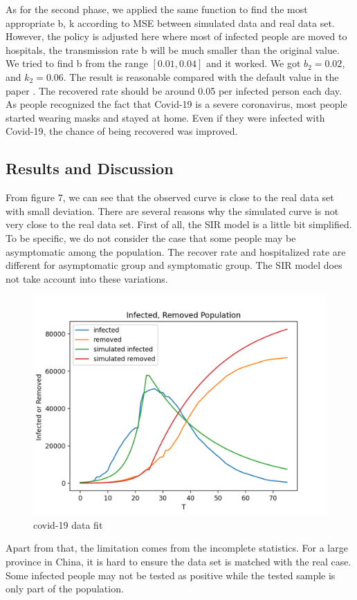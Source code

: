 \documentclass{article}
\begin{document}
As for the second phase, we applied the same function to find the most appropriate b, k according to MSE between simulated data and real data set. However, the policy is adjusted here where most of infected people are moved to hospitals, the transmission rate b will be much smaller than the original value. We tried to find b from the range $[0.01, 0.04]$ and it worked. We got $b_{2}= 0.02$, and $k_{2} = 0.06$. The result is reasonable compared with the default value in the paper \cite{Cooper2020SIR}. The recovered rate should be around 0.05 per infected person each day. As people recognized the fact that Covid-19 is a severe coronavirus, most people started wearing masks and stayed at home. Even if they were infected with Covid-19, the chance of being recovered was improved. 





\subsection{Results and Discussion}

From figure 7, we can see that the observed curve is close to the real data set with small deviation. There are several reasons why the simulated curve is not very close to the real data set. First of all, the SIR model is a little bit simplified. To be specific, we do not consider the case that some people may be asymptomatic among the population. The recover rate and hospitalized rate are different for asymptomatic group and symptomatic group. The SIR model does not take account into these variations. 


\begin{figure}[htp]
\centering
\includegraphics[width=.4\textwidth]{covidsir4.png}
\caption{covid-19 data fit}
\label{fig:figure6}
\end{figure}



Apart from that, the limitation comes from the incomplete statistics. For a large province in China, it is hard to ensure the data set is matched with the real case. Some infected people may not be tested as positive while the tested sample is only part of the population.
\end{document}
